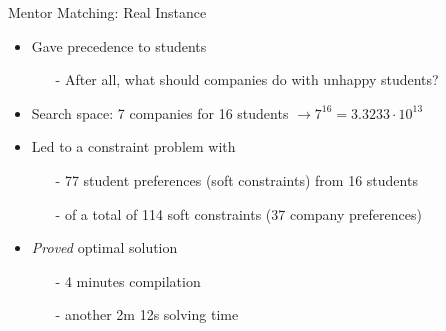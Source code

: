 \documentclass[handout,10pt,xcolor={dvipsnames},fleqn]{beamer}
\begin{document}
\begin{frame}[fragile]{Mentor Matching: Real Instance}
\begin{itemize}
\item Gave precedence to \alert{students}
\begin{itemize}
\item[-] After all, what should companies do with unhappy students?
\end{itemize}
\item Search space: 7 companies for 16 students $\rightarrow 7^{16} = 3.3233 \cdot 10^{13}$
\vspace*{2ex}
\item Led to a constraint problem with 
\begin{itemize}
\item[-] 77 student preferences (soft constraints) from 16 students
\item[-] of a total of 114 soft constraints (37 company preferences) 
\end{itemize}

\vspace*{2ex}

\item \emph{Proved} optimal solution 
\begin{itemize}
\item[-] 4 minutes compilation 
\item[-] another 2m 12s solving time
\end{itemize}
\end{itemize}
\end{frame}
\end{document}
